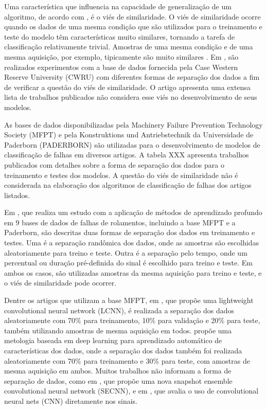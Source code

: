 \documentclass[conference]{IEEEtran}
\begin{document}
Uma característica que influencia na capacidade de generalização de um algoritmo, de acordo com \cite{b4}, é o viés de similaridade.
O viés de similaridade ocorre quando os dados de uma mesma condição que são utilizados para o treinamento e teste do modelo têm características muito similares, tornando a tarefa de classificação relativamente trivial.
Amostras de uma mesma condição e de uma mesma aquisição, por exemplo, tipicamente são muito similares \cite{b4}.
Em \cite{b4}, são realizados experimentos com a base de dados fornecida pela Case Western Reserve University (CWRU) com diferentes formas de separação dos dados a fim de verificar a questão do viés de similaridade.
O artigo apresenta uma extensa lista de trabalhos publicados não considera esse viés no desenvolvimento de seus modelos.

As bases de dados disponibilizadas pela Machinery Failure Prevention Technology Society (MFPT) e pela Konstruktions und Antriebstechnik da Universidade de Paderborn (PADERBORN) são utilizadas para o desenvolvimento de modelos de classificação de falhas em diversos artigos.
A tabela XXX apresenta trabalhos publicados com detalhes sobre a forma de separação dos dados para o treinamento e testes dos modelos.
A questão do viés de similaridade não é considerada na elaboração dos algoritmos de classificação de falhas dos artigos listados.

Em \cite{b5}, que realiza um estudo com a aplicação de métodos de aprendizado profundo em 9 bases de dados de falhas de rolamentos, incluindo a base MFPT e a Paderborn, são descritas duas formas de separação dos dados em treinamento e testes.
Uma é a separação randômica dos dados, onde as amostras são escolhidas aleatoriamente para treino e teste.
Outra é a separação pelo tempo, onde um percentual ou duração pré-definida do sinal é escolhido para treino e teste.
Em ambos os casos, são utilizadas amostras da mesma aquisição para treino e teste, e o viés de similaridade pode ocorrer.

Dentre os artigos que utilizam a base MFPT, em \cite{b6}, que propõe uma lightweight convolutional neural network (LCNN), é realizada a separação dos dados aleatoriamente com 70\% para treinamento, 10\% para validação e 20\% para teste, também utilizando amostras de mesma aquisição em todos.
\cite{b7} propõe uma metologia baseada em deep learning para aprendizado automático de características dos dados, onde a separação dos dados também foi realizada aleatoriamente com 70\% para treinamento e 30\% para teste, com amostras de mesma aquisição em ambos.
Muitos trabalhos não informam a forma de separação de dados, como em \cite{b8}, que propõe uma nova snapshot ensemble convolutional neural network (SECNN), e em \cite{b9}, que avalia o uso de convolutional neural nets (CNN) diretamente nos sinais.
\end{document}
